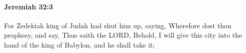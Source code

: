 
		\paragraph{Jeremiah 32:3} %
			\label{JEREMIAH-32-3}

			For Zedekiah king of Judah had shut him up, saying, Wherefore dost thou prophesy, and say, Thus saith the LORD, Behold, I will give this city into the hand of the king of Babylon, and he shall take it;


